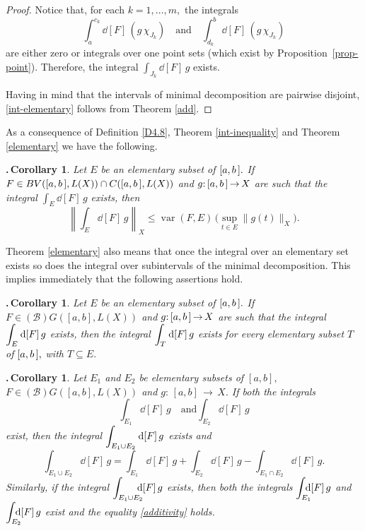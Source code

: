 \documentclass[12pt,twoside]{article}
\numberwithin{equation}{section}
\theoremstyle{plain}
\newtheorem{corollary}[theorem]{\hskip-1mm.\,Corollary}
\theoremstyle{definition}
\DeclareMathOperator{\var}{var}
\begin{document}
{\begin{proof}
\smallskip

Notice that, for each $k=1,\dots,m,$ the integrals
\[
   \int_{a}^{c_k}\dd[F]\,(g\,\chi_{J_k})
   \quad\mbox{and}\quad
   \int_{d_k}^{b}\dd[F]\,(g\,\chi_{J_k})
\]
are either zero or integrals over one point sets (which exist by
Proposition~\ref{prop-point}). Therefore, the integral $\int_{J_k}\dd[F]\,g$ exists.

\smallskip

Having in mind that the intervals of minimal decomposition are pairwise disjoint, \eqref{int-elementary}
follows from Theorem \ref{add}.
\end{proof}

\smallskip

As a consequence of Definition \ref{D4.8}, Theorem \ref{int-inequality} and Theorem \ref{elementary}
we have the following.

\smallskip

\begin{corollary}\label{estimate-elementary}
Let $E$ be an elementary subset of $[a,b\,].$ If $F\in BV([a,b\,],L(X))\cap C([a,b\,],L(X))$ and $g{:}\,[a,b\,]\,{\to}\,X$ are
such that the integral $\int_{E}\dd[F]\,g$ exists, then
\[
   \left\|\int_{E}\dd[F]\,g\right\|_X\leq \var(F,E)\,\Big(\sup_{t\in E}\|g(t)\|_X\Big).
\]
\end{corollary}

\smallskip

Theorem \ref{elementary} also means that once the integral over an elementary set exists
so does the integral over subintervals of the minimal decomposition.
This implies immediately that the following assertions hold.

\smallskip

\begin{corollary}
Let $E$ be an elementary subset of $[a,b\,].$ If $F\in(\mathcal{B})G([a,b],L(X))$ and $g{:}\,[a,b\,]\,{\to}\,X$
are such that the integral $\displaystyle\int_E\hskip0.2mm\mbox{\rm d}[F]\,g$ exists, then the integral $\displaystyle\int_T\hskip0.2mm\mbox{\rm d}[F]\,g$ exists for every
elementary subset $T$ of $[a,b\,],$ with $T\subseteq E.$
\end{corollary}

\smallskip

\begin{corollary}
Let $E_{1}$ and $E_{2}$ be elementary subsets of $[a,b],$
$F\in(\mathcal{B})G([a,b],L(X))$ and $g{:}\,[a,b]\,{\to}\,X.$ If both the integrals
\[
   \int_{E_1}\dd[F]\,g \quad\mbox{and} \int_{E_2}\dd[F]\,g
\]
exist, then the integral $\displaystyle\int_{E_1\cup E_2}\hskip0.2mm\mbox{\rm d}[F]\,g$ exists and
\begin{equation}\label{additivity}
    \int_{E_1\cup E_2}\dd[F]\,g
   =\int_{E_1}\dd[F]\,g+\int_{E_2}\dd[F]\,g-\int_{E_1\cap E_2}\dd[F]\,g.
\end{equation}
Similarly, if the integral $\dis\int_{E_1\cup E_2}\hskip-3mm\dd[F]\,g$ exists, then both
the integrals $\dis\int_{E_1}\hskip-3mm\dd[F]\,g$ and $\dis\int_{E_2}\hskip-3mm\dd[F]\,g$
exist and the equality \eqref{additivity} holds.
\end{corollary}

}
\end{document}
